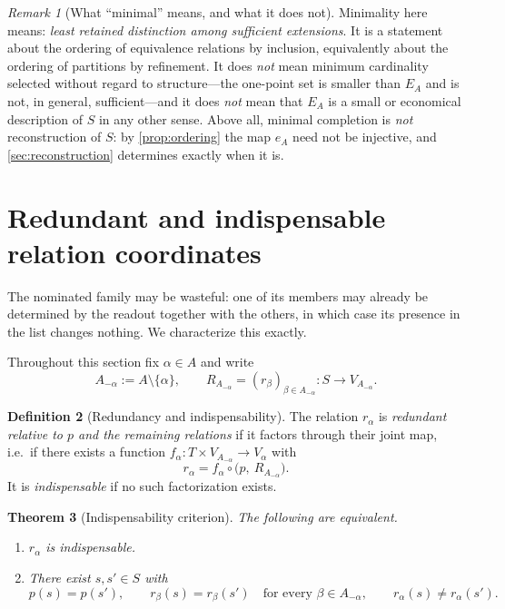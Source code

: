 \documentclass[11pt,reqno]{amsart}
\theoremstyle{plain}
\newtheorem{theorem}{Theorem}[section]
\theoremstyle{definition}
\newtheorem{definition}[theorem]{Definition}
\theoremstyle{remark}
\newtheorem{remark}[theorem]{Remark}
\numberwithin{equation}{section}
\begin{document}
\begin{remark}[What ``minimal'' means, and what it does not]
\label{rem:minimality}
Minimality here means: \emph{least retained distinction among sufficient extensions}. It is a
statement about the ordering of equivalence relations by inclusion, equivalently about the ordering
of partitions by refinement. It does \emph{not} mean minimum cardinality selected without regard to
structure---the one-point set is smaller than $E_A$ and is not, in general, sufficient---and it does
\emph{not} mean that $E_A$ is a small or economical description of $S$ in any other sense. Above all,
minimal completion is \emph{not} reconstruction of $S$: by \cref{prop:ordering} the map $e_A$ need
not be injective, and \cref{sec:reconstruction} determines exactly when it is.
\end{remark}

\section{Redundant and indispensable relation coordinates}
\label{sec:redundancy}

The nominated family may be wasteful: one of its members may already be determined by the readout
together with the others, in which case its presence in the list changes nothing. We characterize
this exactly.

Throughout this section fix $\alpha\in A$ and write
\begin{equation}
\label{eq:A-minus}
A_{-\alpha}:=A\setminus\{\alpha\},
\qquad
R_{A_{-\alpha}}=(r_\beta)_{\beta\in A_{-\alpha}}\colon S\to V_{A_{-\alpha}} .
\end{equation}

\begin{definition}[Redundancy and indispensability]
\label{def:redundant}
The relation $r_\alpha$ is \emph{redundant relative to $p$ and the remaining relations} if it factors
through their joint map, i.e.\ if there exists a function
$f_\alpha\colon T\times V_{A_{-\alpha}}\to V_\alpha$ with
\begin{equation}
\label{eq:redundant}
r_\alpha=f_\alpha\circ\bigl(p,\ R_{A_{-\alpha}}\bigr).
\end{equation}
It is \emph{indispensable} if no such factorization exists.
\end{definition}

\begin{theorem}[Indispensability criterion]
\label{thm:indispensable}
The following are equivalent.
\begin{enumerate}
\item\label{it:indisp} $r_\alpha$ is indispensable.
\item\label{it:witness} There exist $s,s'\in S$ with
\begin{equation}
\label{eq:witness}
p(s)=p(s'),
\qquad
r_\beta(s)=r_\beta(s')\quad\text{for every }\beta\in A_{-\alpha},
\qquad
r_\alpha(s)\neq r_\alpha(s').
\end{equation}
\end{enumerate}
\end{theorem}
\end{document}
